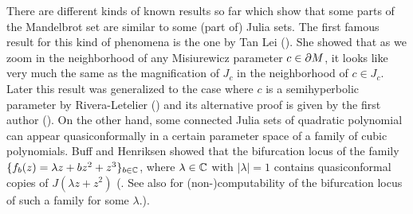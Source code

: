 There are different kinds of known results so far which show that
some parts of the Mandelbrot set are similar to some (part of) Julia sets. 
The first famous result for this kind of phenomena is the one by Tan Lei 
(\cite{Tan Lei 1990}). She showed that as we zoom in the neighborhood of
any Misiurewicz parameter $c \in \partial M$, it looks like very much the same as
the magnification of $J_c$ in the neighborhood of $c \in J_c$. Later this
result was generalized to the case where $c$ is a semihyperbolic parameter
by Rivera-Letelier (\cite{Rivera-Letelier 2001}) and its alternative proof
is given by the first author (\cite{Kawahira 2014}). 
On the other hand, some connected Julia sets of quadratic polynomial can
appear quasiconformally in a certain parameter space of a family of cubic 
polynomials. Buff and Henriksen showed that the bifurcation locus of the family 
$\{ f_b(z) = \lambda z + bz^2 + z^3 \}_{b \in \mathbb C}$, where  $\lambda \in \mathbb C$ with
$|\lambda|=1$ contains quasiconformal copies of $J(\lambda z + z^2)$ 
(\cite{Buff-Henriksen 2001}. See also \cite{Cornell-Rojas-Yampolsky 2017} 
for (non-)computability of the bifurcation locus of such a family for some 
$\lambda$.).




